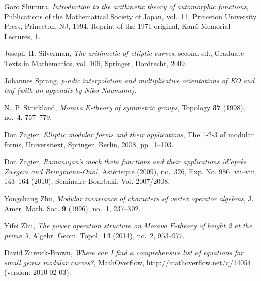 \documentclass{gtpart}
\theoremstyle{definition}
\theoremstyle{remark}
\renewcommand{\=}{\approx}
\renewcommand{\-}{\sim}
\numberwithin{equation}{section}
\begin{document}
\begin{thebibliography}
Goro Shimura, \emph{Introduction to the arithmetic theory of automorphic
  functions}, Publications of the Mathematical Society of Japan, vol.~11,
  Princeton University Press, Princeton, NJ, 1994, Reprint of the 1971
  original, Kan{\^o} Memorial Lectures, 1. 

Joseph~H. Silverman, \emph{The arithmetic of elliptic curves}, second ed.,
  Graduate Texts in Mathematics, vol. 106, Springer, Dordrecht, 2009.

Johannes Sprang, \emph{p-adic interpolation and multiplicative orientations of
  {KO} and tmf (with an appendix by {N}iko {N}aumann)}. 

N.~P. Strickland, \emph{Morava {$E$}-theory of symmetric groups}, Topology
  \textbf{37} (1998), no.~4, 757--779. 

Don Zagier, \emph{Elliptic modular forms and their applications}, The 1-2-3 of
  modular forms, Universitext, Springer, Berlin, 2008, pp.~1--103. 

Don Zagier, \emph{Ramanujan's mock theta functions and their applications
  [d'apr\`es {Z}wegers and {B}ringmann-{O}no]}, Ast\'erisque (2009), no.~326,
  Exp. No. 986, vii--viii, 143--164 (2010), S{\'e}minaire Bourbaki. Vol.
  2007/2008. 

Yongchang Zhu, \emph{Modular invariance of characters of vertex operator
  algebras}, J. Amer. Math. Soc. \textbf{9} (1996), no.~1, 237--302.

Yifei Zhu, \emph{The power operation structure on {M}orava {$E$}-theory of
  height 2 at the prime 3}, Algebr. Geom. Topol. \textbf{14} (2014), no.~2,
  953--977. 

David Zureick-Brown,
  \emph{Where can {I} find a comprehensive list of equations for small genus
  modular curves?}, MathOverflow, \href{http://mathoverflow.net/q/14054}
  {http://mathoverflow.net/q/14054} (version: 2010-02-03).

\end{thebibliography}
\end{document}
